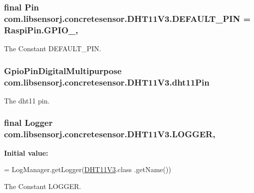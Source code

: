 \subsubsection[{D\+E\+F\+A\+U\+L\+T\+\_\+\+P\+I\+N}]{\setlength{\rightskip}{0pt plus 5cm}final Pin com.\+libsensorj.\+concretesensor.\+D\+H\+T11\+V3.\+D\+E\+F\+A\+U\+L\+T\+\_\+\+P\+I\+N = Raspi\+Pin.\+G\+P\+I\+O\+\_\hspace{0.3cm}{\ttfamily [static]}, {\ttfamily [private]}}\label{classcom_1_1libsensorj_1_1concretesensor_1_1DHT11V3_a5abd2ea6b296cbd458df3e9170201913}
The Constant D\+E\+F\+A\+U\+L\+T\+\_\+\+P\+I\+N. \hypertarget{classcom_1_1libsensorj_1_1concretesensor_1_1DHT11V3_ab72b7b7ed1bd497e7b2818147afeeba9}{}
\subsubsection[{dht11\+Pin}]{\setlength{\rightskip}{0pt plus 5cm}Gpio\+Pin\+Digital\+Multipurpose com.\+libsensorj.\+concretesensor.\+D\+H\+T11\+V3.\+dht11\+Pin\hspace{0.3cm}{\ttfamily [private]}}\label{classcom_1_1libsensorj_1_1concretesensor_1_1DHT11V3_ab72b7b7ed1bd497e7b2818147afeeba9}
The dht11 pin. \hypertarget{classcom_1_1libsensorj_1_1concretesensor_1_1DHT11V3_ac0cd3bfc7916b033ac50cebead5ba268}{}
\subsubsection[{L\+O\+G\+G\+E\+R}]{\setlength{\rightskip}{0pt plus 5cm}final Logger com.\+libsensorj.\+concretesensor.\+D\+H\+T11\+V3.\+L\+O\+G\+G\+E\+R\hspace{0.3cm}{\ttfamily [static]}, {\ttfamily [private]}}\label{classcom_1_1libsensorj_1_1concretesensor_1_1DHT11V3_ac0cd3bfc7916b033ac50cebead5ba268}
{\bfseries Initial value\+:}
\begin{DoxyCode}
= LogManager.getLogger(\hyperlink{classcom_1_1libsensorj_1_1concretesensor_1_1DHT11V3_a4996e16bdabeb71e35d8358a7e8248ca}{DHT11V3}.class
            .getName())
\end{DoxyCode}
The Constant L\+O\+G\+G\+E\+R. \hypertarget{classcom_1_1libsensorj_1_1concretesensor_1_1DHT11V3_a0c34b9cc559817c10910b1a6180decfd}{}
